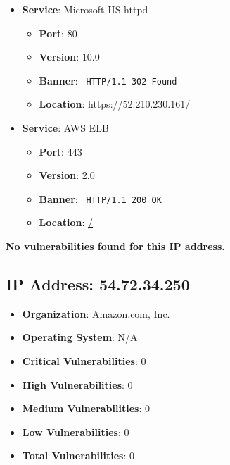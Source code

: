 \documentclass{article}
\begin{document}
\begin{itemize}
    
        \item \textbf{Service}: Microsoft IIS httpd
        \begin{itemize}
            \item \textbf{Port}: 80
            \item \textbf{Version}:  10.0 
            \item \textbf{Banner}: \texttt{
                HTTP/1.1 302 Found
            }
            \item \textbf{Location}: \href{ https://52.210.230.161/ }{ https://52.210.230.161/ }
        \end{itemize}
    
        \item \textbf{Service}: AWS ELB
        \begin{itemize}
            \item \textbf{Port}: 443
            \item \textbf{Version}:  2.0 
            \item \textbf{Banner}: \texttt{
                HTTP/1.1 200 OK
            }
            \item \textbf{Location}: \href{ / }{ / }
        \end{itemize}
    
\end{itemize}


\textbf{No vulnerabilities found for this IP address.}




\clearpage



\subsection*{IP Address: 54.72.34.250}

\begin{itemize}
    \item \textbf{Organization}: Amazon.com, Inc.
    \item \textbf{Operating System}:  N/A 
    \item \textbf{Critical Vulnerabilities}: 0
    \item \textbf{High Vulnerabilities}: 0
    \item \textbf{Medium Vulnerabilities}: 0
    \item \textbf{Low Vulnerabilities}: 0
    \item \textbf{Total Vulnerabilities}: 0
\end{itemize}
\end{document}
